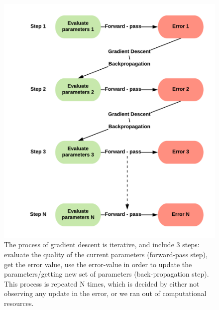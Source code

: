 \begin{figure}
    \centering
    \includegraphics{images/gbem/gradient_descent_informal.png}
    \caption{The process of gradient descent is iterative, and include 3 steps: evaluate the quality of the current parameters (forward-pass step), get the error value, use the error-value in order to update the parameters/getting new set of parameters (back-propagation step). This process is repeated N times, which is decided by either not observing any update in the error, or we ran out of computational resources.}
    \label{fig:grad_descent_inuitive}
\end{figure}

